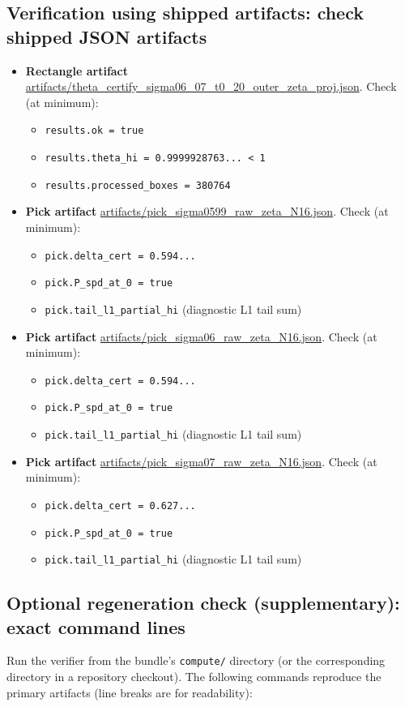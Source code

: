 \documentclass[11pt]{amsart}
\theoremstyle{definition}
\theoremstyle{remark}
\begin{document}
\subsection*{Verification using shipped artifacts: check shipped JSON artifacts}
\begin{itemize}
\item \textbf{Rectangle artifact} \url{artifacts/theta_certify_sigma06_07_t0_20_outer_zeta_proj.json}. Check (at minimum):
\begin{itemize}
  \item \texttt{results.ok = true}
  \item \texttt{results.theta\_hi = 0.9999928763... < 1}
  \item \texttt{results.processed\_boxes = 380764}
  \end{itemize}
\item \textbf{Pick artifact} \url{artifacts/pick_sigma0599_raw_zeta_N16.json}. Check (at minimum):
\begin{itemize}
  \item \texttt{pick.delta\_cert = 0.594...}
  \item \texttt{pick.P\_spd\_at\_0 = true}
  \item \texttt{pick.tail\_l1\_partial\_hi} (diagnostic L1 tail sum)
  \end{itemize}
\item \textbf{Pick artifact} \url{artifacts/pick_sigma06_raw_zeta_N16.json}. Check (at minimum):
\begin{itemize}
  \item \texttt{pick.delta\_cert = 0.594...}
  \item \texttt{pick.P\_spd\_at\_0 = true}
  \item \texttt{pick.tail\_l1\_partial\_hi} (diagnostic L1 tail sum)
  \end{itemize}
\item \textbf{Pick artifact} \url{artifacts/pick_sigma07_raw_zeta_N16.json}. Check (at minimum):
\begin{itemize}
  \item \texttt{pick.delta\_cert = 0.627...}
  \item \texttt{pick.P\_spd\_at\_0 = true}
  \item \texttt{pick.tail\_l1\_partial\_hi} (diagnostic L1 tail sum)
  \end{itemize}
\end{itemize}

\subsection*{Optional regeneration check (supplementary): exact command lines}
Run the verifier from the bundle's \texttt{compute/} directory (or the corresponding directory in a repository checkout).
The following commands reproduce the primary artifacts (line breaks are for readability):
\end{document}
